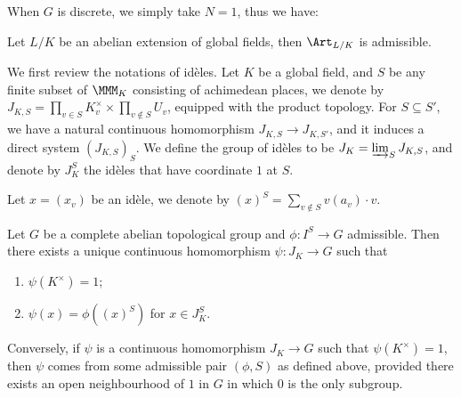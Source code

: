 \begin{remark}
    When $G$ is discrete, we simply take $N=1$, thus we have:
\end{remark}

\begin{theorem}
    Let $L/K$ be an abelian extension of global fields, then $\Art_{L/K}$ is admissible.
\end{theorem}



\begin{notation}
    We first review the notations of id\`eles. Let $K$ be a global field, and $S$ be any finite subset of $\MMM_K$ consisting of achimedean places, we denote by \dis$J_{K,S}=\prod_{v\in S}{K_v^\times}\times\prod_{v\not\in S}{U_v}$, equipped with the product topology. For $S\subseteq S'$, we have a natural continuous homomorphism $J_{K,S}\to J_{K,S'}$, and it induces a direct system $(J_{K,S})_S$. We define the group of id\`eles to be \dis$J_K=\varinjlim_S{J_{K,S}}$, and denote by $J_K^S$ the id\`eles that have coordinate $1$ at $S$.
\end{notation}

\begin{notation}
    Let $x=(x_v)$ be an id\`ele, we denote by \dis$(x)^S=\sum_{v\not\in S}{v(a_v)\cdot v}$.
\end{notation}

\begin{proposition}
    Let $G$ be a complete abelian topological group and $\phi:I^S\to G$ admissible. Then there exists a unique continuous homomorphism $\psi:J_K\to G$ such that
    \begin{multicols}{2}
        \begin{enumerate}
            \item $\psi(K^\times)=1$;
            \item $\psi(x)=\phi((x)^S)$ for $x\in J_K^S$.
        \end{enumerate}
    \end{multicols}
    Conversely, if $\psi$ is a continuous homomorphism $J_K\to G$ such that $\psi(K^\times)=1$, then $\psi$ comes from some admissible pair $(\phi,S)$ as defined above, provided there exists an open neighbourhood of $1$ in $G$ in which $0$ is the only subgroup.
\end{proposition}


